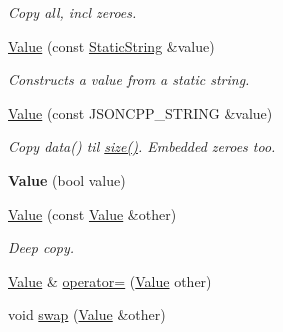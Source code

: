 \begin{DoxyCompactItemize}
\begin{DoxyCompactList}\small\item\em Copy all, incl zeroes. \end{DoxyCompactList}\item 
\hyperlink{class_json_1_1_value_a081830e95f88a37054da7e46c65b0766}{Value} (const \hyperlink{class_json_1_1_static_string}{Static\+String} \&value)
\begin{DoxyCompactList}\small\item\em Constructs a value from a static string. \end{DoxyCompactList}\item 
\hyperlink{class_json_1_1_value_a89ef37969ff7c6eb3a7afcca03d4cd4a}{Value} (const J\+S\+O\+N\+C\+P\+P\+\_\+\+S\+T\+R\+I\+NG \&value)\hypertarget{class_json_1_1_value_a89ef37969ff7c6eb3a7afcca03d4cd4a}{}\label{class_json_1_1_value_a89ef37969ff7c6eb3a7afcca03d4cd4a}

\begin{DoxyCompactList}\small\item\em Copy data() til \hyperlink{class_json_1_1_value_a4ca8ee6c48a34ca6c2f131956bab5e05}{size()}. Embedded zeroes too. \end{DoxyCompactList}\item 
{\bfseries Value} (bool value)\hypertarget{class_json_1_1_value_a350a31ea4a30d384994b0bc010b17495}{}\label{class_json_1_1_value_a350a31ea4a30d384994b0bc010b17495}

\item 
\hyperlink{class_json_1_1_value_a436dfd3670f95fd665f680eba5cebcf0}{Value} (const \hyperlink{class_json_1_1_value}{Value} \&other)\hypertarget{class_json_1_1_value_a436dfd3670f95fd665f680eba5cebcf0}{}\label{class_json_1_1_value_a436dfd3670f95fd665f680eba5cebcf0}

\begin{DoxyCompactList}\small\item\em Deep copy. \end{DoxyCompactList}\item 
\hyperlink{class_json_1_1_value}{Value} \& \hyperlink{class_json_1_1_value_a795acb28772da4c5d85ae8f4af36c69f}{operator=} (\hyperlink{class_json_1_1_value}{Value} other)
\item 
void \hyperlink{class_json_1_1_value_aab841120d78e296e1bc06a373345e822}{swap} (\hyperlink{class_json_1_1_value}{Value} \&other)\hypertarget{class_json_1_1_value_aab841120d78e296e1bc06a373345e822}{}\label{class_json_1_1_value_aab841120d78e296e1bc06a373345e822}


\end{DoxyCompactItemize}
